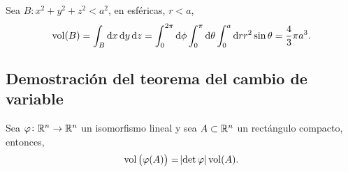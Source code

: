 \begin{example*}
    Sea $B: x^2 + y^2 + z^2 < a^2$, en esf\'ericas, $r < a$,
    \[
        \vol(B) = \int_B \dif x \dif y \dif z = \int^{2\pi}_0 \dif \phi \int^\pi_0 \dif \theta \int^{a}_0  \dif r r^2 \sin\theta
        = \frac{4}{3} \pi a^3.
    \]
\end{example*}

\subsection*{Demostración del teorema del cambio de variable}

\begin{lema*}[1]\label{lema:uno_cambio}
    Sea $\varphi \colon \mathbb{R}^n \to \mathbb{R}^n$ un isomorfismo lineal y sea $A \subset \mathbb{R}^n$ un rectángulo compacto, entonces,
    \[
        \operatorname{vol}\left( \varphi(A) \right) = \abs{\det \varphi} \operatorname{vol}(A).
    \]
\end{lema*}

